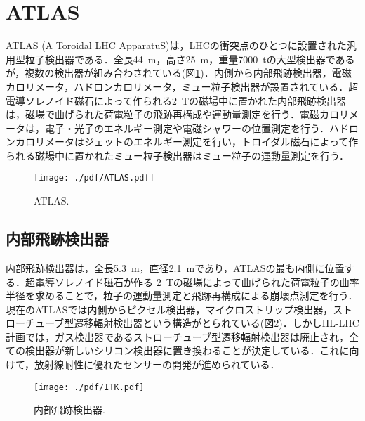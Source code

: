 \section{ATLAS}
ATLAS (A Toroidal LHC ApparatuS)は，LHCの衝突点のひとつに設置された汎用型粒子検出器である．全長44~m，高さ25~m，重量7000~tの大型検出器であるが，複数の検出器が組み合わされている(図\ref{fig:ATLAS})．内側から内部飛跡検出器，電磁カロリメータ，ハドロンカロリメータ，ミュー粒子検出器が設置されている．超電導ソレノイド磁石によって作られる2~Tの磁場中に置かれた内部飛跡検出器は，磁場で曲げられた荷電粒子の飛跡再構成や運動量測定を行う．電磁カロリメータは，電子・光子のエネルギー測定や電磁シャワーの位置測定を行う．ハドロンカロリメータはジェットのエネルギー測定を行い，トロイダル磁石によって作られる磁場中に置かれたミュー粒子検出器はミュー粒子の運動量測定を行う．
\begin{figure}[H]
	\centering
	\texttt{[image: ./pdf/ATLAS.pdf]}
	\caption{ATLAS\cite{cern}.}
	\label{fig:ATLAS}
\end{figure}
\subsection*{内部飛跡検出器}
内部飛跡検出器は，全長5.3~m，直径2.1~mであり，ATLASの最も内側に位置する．超電導ソレノイド磁石が作る
2~Tの磁場によって曲げられた荷電粒子の曲率半径を求めることで，粒子の運動量測定と飛跡再構成による崩壊点測定を行う．現在のATLASでは内側からピクセル検出器，マイクロストリップ検出器，ストローチューブ型遷移輻射検出器という構造がとられている(図\ref{fig:ITK})．しかしHL-LHC計画では，ガス検出器であるストローチューブ型遷移輻射検出器は廃止され，全ての検出器が新しいシリコン検出器に置き換わることが決定している．これに向けて，放射線耐性に優れたセンサーの開発が進められている．
\begin{figure}[H]
	\centering
	\texttt{[image: ./pdf/ITK.pdf]}
	\caption{内部飛跡検出器\cite{cern}.}
	\label{fig:ITK}
\end{figure}








